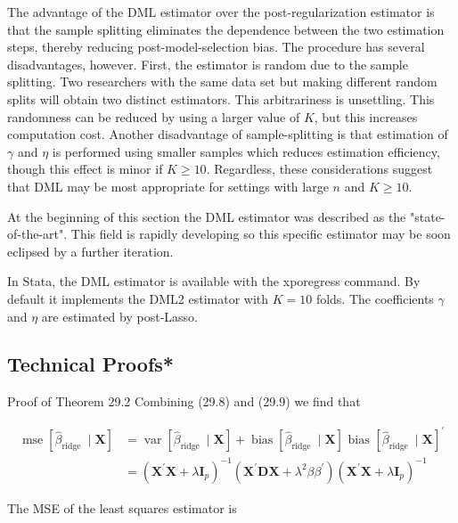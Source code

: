 \documentclass[10pt]{article}
\begin{document}
The advantage of the DML estimator over the post-regularization estimator is that the sample splitting eliminates the dependence between the two estimation steps, thereby reducing post-model-selection bias. The procedure has several disadvantages, however. First, the estimator is random due to the sample splitting. Two researchers with the same data set but making different random splits will obtain two distinct estimators. This arbitrariness is unsettling. This randomness can be reduced by using a larger value of $K$, but this increases computation cost. Another disadvantage of sample-splitting is that estimation of $\gamma$ and $\eta$ is performed using smaller samples which reduces estimation efficiency, though this effect is minor if $K \geq 10$. Regardless, these considerations suggest that DML may be most appropriate for settings with large $n$ and $K \geq 10$.

At the beginning of this section the DML estimator was described as the "state-of-the-art". This field is rapidly developing so this specific estimator may be soon eclipsed by a further iteration.

In Stata, the DML estimator is available with the xporegress command. By default it implements the DML2 estimator with $K=10$ folds. The coefficients $\gamma$ and $\eta$ are estimated by post-Lasso.

\subsection{Technical Proofs*}
Proof of Theorem 29.2 Combining (29.8) and (29.9) we find that

$$
\begin{aligned}
\operatorname{mse}\left[\widehat{\beta}_{\text {ridge }} \mid \boldsymbol{X}\right] &=\operatorname{var}\left[\widehat{\beta}_{\text {ridge }} \mid \boldsymbol{X}\right]+\operatorname{bias}\left[\widehat{\beta}_{\text {ridge }} \mid \boldsymbol{X}\right] \text { bias }\left[\widehat{\beta}_{\text {ridge }} \mid \boldsymbol{X}\right]^{\prime} \\
&=\left(\boldsymbol{X}^{\prime} \boldsymbol{X}+\lambda \boldsymbol{I}_{p}\right)^{-1}\left(\boldsymbol{X}^{\prime} \boldsymbol{D} \boldsymbol{X}+\lambda^{2} \beta \beta^{\prime}\right)\left(\boldsymbol{X}^{\prime} \boldsymbol{X}+\lambda \boldsymbol{I}_{p}\right)^{-1}
\end{aligned}
$$

The MSE of the least squares estimator is
\end{document}

